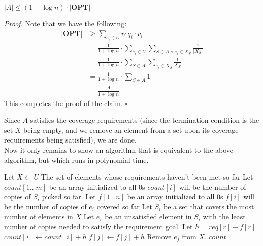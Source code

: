 \documentclass[a4paper]{article}
\newenvironment{proof}{\begin{breakbox}\textit{Proof.}}{\hfill$\square$\end{breakbox}}
\newcommand{\nl}{\vspace{0.2cm}\\}
\newcommand{\OPT}{\mathbf{OPT}}
\begin{document}
\begin{claim}
    $|A| \le (1 + \log n) \cdot |\OPT|$
\end{claim}
\begin{proof}
    Note that we have the following:
    \begin{align*}
        |\OPT| &\ge \sum_{e_i \in U} req_i \cdot v_i\\
               &= \frac{1}{1 + \log n} \cdot \sum_{e_i \in U} \sum_{S \in A \land e_i \in X_S} \frac{1}{|X_S|}\\
               &= \frac{1}{1 + \log n} \cdot \sum_{S \in A} \sum_{e_i \in X_S} \frac{1}{X_S}\\
               &= \frac{1}{1 + \log n} \cdot \sum_{S \in A} 1\\
               &= \frac{|A|}{1 + \log n}
    \end{align*}
    This completes the proof of the claim.
\end{proof}
Since $A$ satisfies the coverage requirements (since the termination condition is the set $X$ being empty, and we remove an element from a set upon its coverage requirements being satisfied), we are
done.\nl

Now it only remains to show an algorithm that is equivalent to the above algorithm, but which runs in polynomial time.
\begin{algorithmic}[1]
        \State Let $X \gets U$ \Comment The set of elements whose requirements haven't been met so far
        \State Let $count[1\ldots m]$ be an array initialized to all $0$s
        \Comment $count[i]$ will be the number of copies of $S_i$ picked so far.
        \State Let $f[1\ldots n]$ be an array initialized to all 0s
        \Comment $f[i]$ will be the number of copies of $e_i$ covered so far
            \State Let $S_i$ be a set that covers the most number of elements in $X$
            \State Let $e_r$ be an unsatisfied element in $S_i$ with the least number of copies needed to satisfy the requirement goal.
            \State Let $h = req[r] - f[r]$
            \State $count[i] \gets count[i] + h$
                \State $f[j] \gets f[j] + h$
                    \State Remove $e_j$ from $X$.
                \EndIf
            \EndFor
        \EndWhile
        \State \Return $count$
    \EndFunction
\end{algorithmic}
\end{document}
